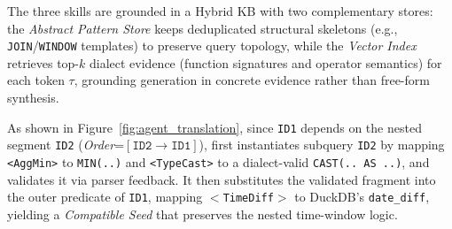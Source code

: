 \documentclass[conference]{IEEEtran}
\begin{document}
The three skills are grounded in a Hybrid KB with two complementary stores: the \textit{Abstract Pattern Store} keeps deduplicated structural skeletons (e.g., \texttt{JOIN}/\texttt{WINDOW} templates) to preserve query topology, while the \textit{Vector Index} retrieves top-$k$ dialect evidence (function signatures and operator semantics) for each token $\tau$, grounding generation in concrete evidence rather than free-form synthesis.

As shown in Figure~\ref{fig:agent_translation}, since \texttt{ID1} depends on the nested segment \texttt{ID2} (\textit{Order}=$[\mathtt{ID2} \rightarrow \mathtt{ID1}]$), \tool{} first instantiates subquery \texttt{ID2} by mapping \texttt{<AggMin>} to \texttt{MIN(..)} and \texttt{<TypeCast>} to a dialect-valid \texttt{CAST(.. AS ..)}, and validates it via parser feedback. It then substitutes the validated fragment into the outer predicate of \texttt{ID1}, mapping $<$\texttt{TimeDiff}$>$ to DuckDB's \texttt{date\_diff}, yielding a \textit{Compatible Seed} that preserves the nested time-window logic.
\end{document}
